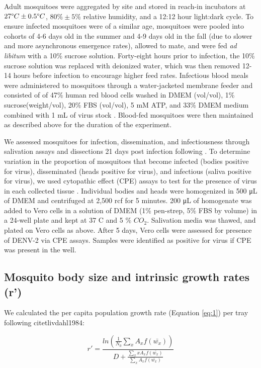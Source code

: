 \documentclass[12pt]{article}
\begin{document}
Adult mosquitoes were aggregated by site and stored in reach-in incubators at $27 \degree C \pm 0.5 \degree C$, $80\% \pm 5\%$ relative humidity, and a 12:12 hour light:dark cycle. To ensure infected mosquitoes were of a similar age, mosquitoes were pooled into cohorts of 4-6 days old in the summer and 4-9 days old in the fall (due to slower and more asynchronous emergence rates), allowed to mate, and were fed \textit{ad libitum} with a 10\% sucrose solution. Forty-eight hours prior to infection, the 10\% sucrose solution was replaced with deionized water, which was then removed 12-14 hours before infection to encourage higher feed rates. Infectious blood meals were administered to mosquitoes through a water-jacketed membrane feeder and consisted of of 47\% human red blood cells washed in DMEM (vol/vol), 1\% sucrose(weight/vol), 20\% FBS (vol/vol), 5 mM ATP, and 33\% DMEM medium combined with 1 mL of virus stock \citep{shan2016}. Blood-fed mosquitoes were then maintained as described above for the duration of the experiment.

We assessed mosquitoes for infection, dissemination, and infectiousness through salivation assays and dissections 21 days post infection following \citep{tesla2017}. To determine variation in the proportion of mosquitoes that become infected (bodies positive for virus), disseminated (heads positive for virus), and infectious (saliva positive for virus), we used cytopathic effect (CPE) assays to test for the presence of virus in each collected tissue \citep{balaya1969}. Individual bodies and heads were homogenized in 500 \si{\micro\liter} of DMEM and centrifuged at 2,500 rcf for 5 minutes. 200 \si{\micro\liter} of homogenate was added to Vero cells in a solution of DMEM (1\% pen-strep, 5\% FBS by volume) in a 24-well plate and kept at 37 \degree C and 5 \% ${CO_2}$. Salivation media was thawed, and plated on Vero cells as above. After 5 days, Vero cells were assessed for presence of DENV-2 via CPE assays. Samples were identified as positive for virus if CPE was present in the well.

\subsection{Mosquito body size and intrinsic growth rates (r')}

We calculated the per capita population growth rate (Equation \ref{eq:1}) per tray following citet{livdahl1984}:

\begin{equation} \label{eq:1}
r' = \frac{ln(\frac{1}{N_0}\sum_{x}^{ }{A_x}f(\bar{w_x}))}{D+\frac{\sum_{x}^{ }xA_xf(\bar{w_x})}{\sum_{x}^{ }A_xf(\bar{w_x})}}
\end{equation}
\end{document}
